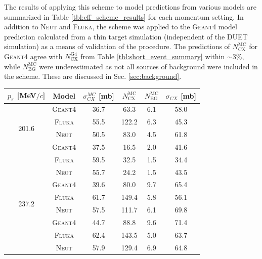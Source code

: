 The results of applying this scheme to model predictions from various models are summarized in Table \ref{tbl:eff_scheme_results} for each momentum setting. In addition to \textsc{Neut} and \textsc{Fluka}, the scheme was applied to the \textsc{Geant4} model prediction calculated from a thin target simulation (independent of the DUET simulation) as a means of validation of the procedure. The predictions of $N_{\mathrm{CX}}^{\mathrm{MC}}$ for \textsc{Geant4} agree with $N_{\mathrm{CX}}^{\mathrm{G4}}$ from Table \ref{tbl:short_event_summary} within $\sim$3\%, while $N_{\mathrm{BG}}^{\mathrm{MC}}$ were underestimated as not all sources of background were included in the scheme. These are discussed in Sec. \ref{sec:background}.
\begin{table}[htbp]
\begin{center}
\begin{tabular}{c|c|c|c|c|c}
\hline
$p_{\pi}$ [MeV$/c$] & Model & $\sigma_{CX}^{MC}$ [mb] &  $N_{\mathrm{CX}}^{\mathrm{MC}}$  &  $N_{\mathrm{BG}}^{\mathrm{MC}}$  &  $\sigma_{CX}$ [mb] \\ \hline
\multirow{4}{*}{201.6} %
& \textsc{Geant4} & 36.7 & 63.3 & 6.1 & 58.0 \\
& \textsc{Fluka} & 55.5 & 122.2 & 6.3 & 45.3 \\
& \textsc{Neut} & 50.5 & 83.0 & 4.5 & 61.8 \\ \hline

\multirow{4}{*}{216.6} %
& \textsc{Geant4} & 37.5 & 16.5 & 2.0 & 41.6 \\
& \textsc{Fluka} & 59.5 & 32.5 & 1.5 & 34.4  \\
& \textsc{Neut} & 55.7 & 24.2 & 1.5 & 43.5 \\ \hline

\multirow{4}{*}{237.2} %
& \textsc{Geant4} & 39.6 & 80.0 & 9.7 & 65.4 \\
& \textsc{Fluka} & 61.7 & 149.4 & 5.8 & 56.1 \\
& \textsc{Neut} & 57.5 & 111.7 & 6.1 & 69.8 \\ \hline

\multirow{4}{*}{265.5} %
& \textsc{Geant4} & 44.7 & 88.8 & 9.6 & 71.4 \\
& \textsc{Fluka} & 62.4 & 143.5 & 5.0 & 63.7 \\
& \textsc{Neut} & 57.9 & 129.4 & 6.9 & 64.8 \\ \hline


\end{tabular}
\end{center}
\end{table}
